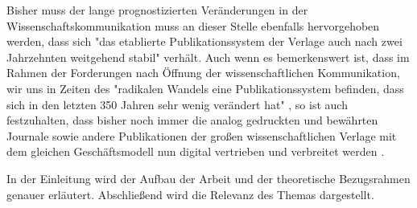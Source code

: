 Bisher muss der lange prognostizierten Veränderungen in der Wissenschaftskommunikation muss an dieser Stelle ebenfalls hervorgehoben werden, dass sich "das etablierte Publikationssystem der Verlage auch nach zwei Jahrzehnten weitgehend stabil"\cite{Hanekop_2014} verhält. Auch wenn es bemerkenswert ist, dass im Rahmen der Forderungen nach Öffnung der wissenschaftlichen Kommunikation, wir uns in Zeiten des "radikalen Wandels eine Publikationssystem befinden, dass sich in den letzten 350 Jahren sehr wenig verändert hat" \cite{poynder_2011_suber}, so ist auch festzuhalten, dass bisher noch immer die analog gedruckten und bewährten Journale sowie andere Publikationen der großen wissenschaftlichen Verlage mit dem gleichen Geschäftsmodell nun digital vertrieben und verbreitet werden \cite{Hanekop_2014} \cite{boai_2012}.

In der Einleitung wird der Aufbau der Arbeit und der theoretische Bezugsrahmen genauer erläutert. Abschließend wird die Relevanz des Themas dargestellt.
